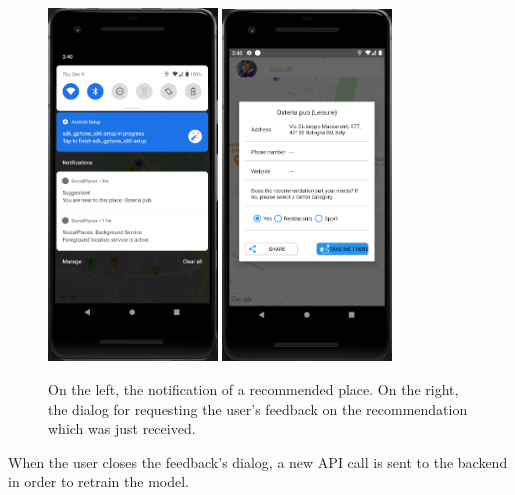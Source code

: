 \documentclass[../../main]{subfiles}
\begin{document}
\begin{figure}[H]
    \centering
    \includegraphics[width=0.4\textwidth]{images/app/notification/recommendation/recommendation_request}
    \includegraphics[width=0.4\textwidth]{images/app/notification/recommendation/user_feedback}
    \caption{On the left, the notification of a recommended place. On the right, the dialog for requesting the user's feedback on the recommendation which was just received.}
\end{figure}
\noindent
When the user closes the feedback's dialog, a new API call is sent to the backend in order to retrain the model.
\end{document}
